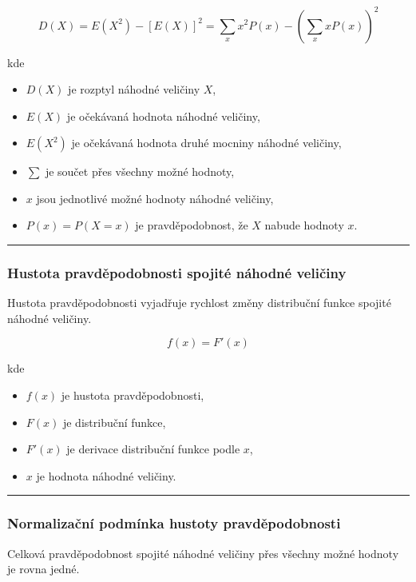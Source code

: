 \documentclass[a4paper, 11pt]{article}
\begin{document}
\begin{equation*}
	D(X) = E(X^2) - [E(X)]^2
	= \sum_x x^2 P(x) - \left(\sum_x x P(x)\right)^2
\end{equation*}

kde

\begin{itemize}[noitemsep]
	\item $D(X)$ je rozptyl náhodné veličiny $X$,
	\item $E(X)$ je očekávaná hodnota náhodné veličiny,
	\item $E(X^2)$ je očekávaná hodnota druhé mocniny náhodné veličiny,
	\item $\sum$ je součet přes všechny možné hodnoty,
	\item $x$ jsou jednotlivé možné hodnoty náhodné veličiny,
	\item $P(x)=P(X=x)$ je pravděpodobnost, že $X$ nabude hodnoty $x$.
\end{itemize}

\noindent\hrule\medskip

\subsubsection{Hustota pravděpodobnosti spojité náhodné veličiny}

Hustota pravděpodobnosti vyjadřuje rychlost změny distribuční
funkce spojité náhodné veličiny.

\begin{equation*}
	f(x) = F'(x)
\end{equation*}

kde

\begin{itemize}[noitemsep]
	\item $f(x)$ je hustota pravděpodobnosti,
	\item $F(x)$ je distribuční funkce,
	\item $F'(x)$ je derivace distribuční funkce podle $x$,
	\item $x$ je hodnota náhodné veličiny.
\end{itemize}

\noindent\hrule\medskip

\subsubsection{Normalizační podmínka hustoty pravděpodobnosti}

Celková pravděpodobnost spojité náhodné veličiny
přes všechny možné hodnoty je rovna jedné.
\end{document}
